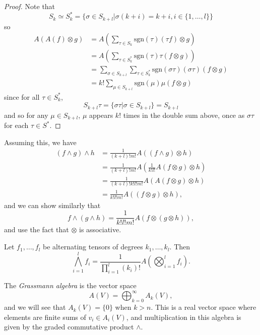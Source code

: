 \begin{proof}
Note that
$$
       S_k
\simeq S_k^\ast
=      \{ \sigma \in S_{k+l}
        | \sigma(k+i) = k + i, i \in \{1, \dots, l\}
       \}
$$
so
\begin{align*}
   A(A(f) \otimes g)
&= A\left(
     \sum_{\tau \in S_k}
       \mathrm{sgn}(\tau)
       (\tau f) \otimes g
   \right) \\
&= A\left(
     \sum_{\tau \in S_k^\ast}
       \mathrm{sgn}(\tau)
       \tau (f \otimes g)
   \right) \\
&= \sum_{\sigma \in S_{k+l}}
     \sum_{\tau \in S_k^\ast}
       \mathrm{sgn}(\sigma \tau)
       (\sigma \tau)(f \otimes g) \\
&= k!
   \sum_{\mu \in S_{k+l}}
     \mathrm{sgn}(\mu)
     \mu(f \otimes g)
\end{align*}
since for all $\tau \in S_k^\ast$,
$$
  S_{k+l} \tau
= \{ \sigma \tau | \sigma \in S_{k+l} \}
= S_{k + l}
$$
and so for any $\mu \in S_{k + l}$, $\mu$ appears $k!$ times in the
double sum above, once as $\sigma \tau$ for each $\tau \in S^\ast$.
\end{proof}

Assuming this, we have
\begin{align*}
   (f \wedge g) \wedge h
&= \frac{1}{(k + l)! m!}
   A((f \wedge g) \otimes h) \\
&= \frac{1}{(k + l)! m!}
   A\left(
     \frac{1}{k! l!}
     A(f \otimes g) \otimes h
   \right) \\
&= \frac{1}{(k + l)! k! l! m!}
   A(A(f \otimes g) \otimes h) \\
&= \frac{1}{k! l! m!}
   A((f \otimes g) \otimes h),
\end{align*}
and we can show similarly that
$$
  f \wedge (g \wedge h)
= \frac{1}{k! l! m!}
  A(f \otimes (g \otimes h)),
$$
and use the fact that $\otimes$ is associative.

\begin{corol}
Let $f_1, \dots, f_l$ be alternating tensors of degrees
$k_1, \dots, k_l$. Then
$$
  \bigwedge_{i=1}^l f_i
= \frac{1}{\prod_{i=1}^l (k_i)!}
  A\left(\bigotimes_{i=1}^l f_i\right).
$$
\end{corol}

\begin{defn}
The \emph{Grassmann algebra} is the vector space
$$
  A(V)
= \bigoplus_{k=0}^\infty
    A_k(V),
$$
and we will see that $A_k(V) = \{ 0 \}$ when $k > n$.
This is a real vector space where elements are finite sums of
$v_i \in A_i(V)$, and multiplication in this algebra is given by the
graded commutative product $\wedge$.
\end{defn}


